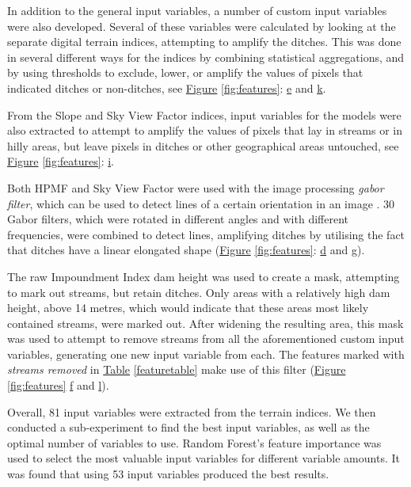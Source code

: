 \documentclass[]{interact}
\theoremstyle{plain}%
\theoremstyle{definition}
\theoremstyle{remark}
\begin{document}
In addition to the general input variables, a number of custom input variables were also developed. Several of these variables were calculated by looking at the separate digital terrain indices, attempting to amplify the ditches. This was done in several different ways for the indices by combining statistical aggregations, and by using thresholds to exclude, lower, or amplify the values of pixels that indicated ditches or non-ditches, see \hyperref[fig:features]{Figure} \ref{fig:features}: \hyperref[fig:features]{e} and \hyperref[fig:features]{k}.

From the Slope and Sky View Factor indices, input variables for the models were also extracted to attempt to amplify the values of pixels that lay in streams or in hilly areas, but leave pixels in ditches or other geographical areas untouched, see \hyperref[fig:features]{Figure} \ref{fig:features}: \hyperref[fig:features]{i}.

\newpage

Both HPMF and Sky View Factor were used with the image processing \textit{gabor filter}, which can be used to detect lines of a certain orientation in an image \citep{gabor}. 30 Gabor filters, which were rotated in different angles and with different frequencies, were combined to detect lines, amplifying ditches by utilising the fact that ditches have a linear elongated shape (\hyperref[fig:features]{Figure} \ref{fig:features}: \hyperref[fig:features]{d} and \hyperref[fig:features]{g}).

\label{impoundmentstreamremoval}
The raw Impoundment Index dam height was used to create a mask, attempting to mark out streams, but retain ditches. Only areas with a relatively high dam height, above 14 metres, which would indicate that these areas most likely contained streams, were marked out. After widening the resulting area, this mask was used to attempt to remove streams from all the aforementioned custom input variables, generating one new input variable from each. The features marked with \textit{streams removed} in \hyperref[featuretable]{Table} \ref{featuretable} make use of this filter (\hyperref[fig:features]{Figure} \ref{fig:features} \hyperref[fig:features]{f} and \hyperref[fig:features]{l}).

Overall, 81 input variables were extracted from the terrain indices. We then conducted a sub-experiment to find the best input variables, as well as the optimal number of variables to use. Random Forest's feature importance was used to select the most valuable input variables for different variable amounts. It was found that using 53 input variables produced the best results.
\end{document}
